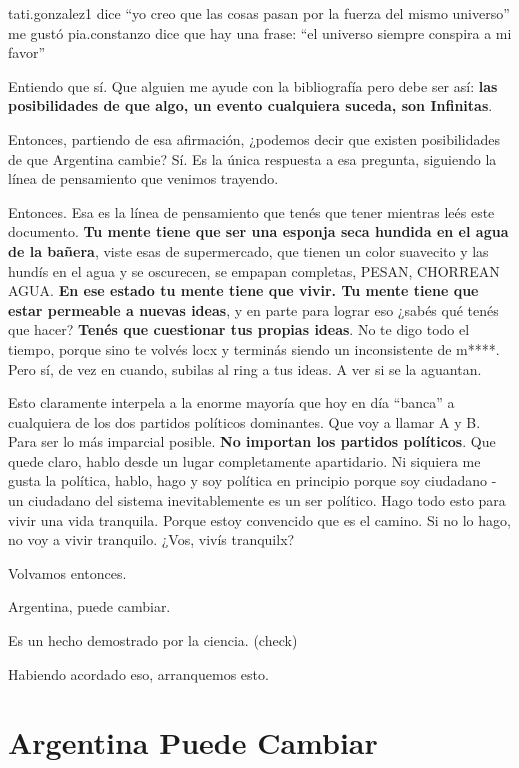 \documentclass[
]{book}
\begin{document}
tati.gonzalez1 dice ``yo creo que las cosas pasan por la fuerza del mismo universo'' me gustó
pia.constanzo dice que hay una frase: ``el universo siempre conspira a mi favor''

Entiendo que sí. Que alguien me ayude con la bibliografía pero debe ser así: \textbf{las posibilidades de que algo, un evento cualquiera suceda, son Infinitas}.

Entonces, partiendo de esa afirmación, ¿podemos decir que existen posibilidades de que Argentina cambie? Sí. Es la única respuesta a esa pregunta, siguiendo la línea de pensamiento que venimos trayendo.

Entonces. Esa es la línea de pensamiento que tenés que tener mientras leés este documento. \textbf{Tu mente tiene que ser una esponja seca hundida en el agua de la bañera}, viste esas de supermercado, que tienen un color suavecito y las hundís en el agua y se oscurecen, se empapan completas, PESAN, CHORREAN AGUA. \textbf{En ese estado tu mente tiene que vivir. Tu mente tiene que estar permeable a nuevas ideas}, y en parte para lograr eso ¿sabés qué tenés que hacer? \textbf{Tenés que cuestionar tus propias ideas}. No te digo todo el tiempo, porque sino te volvés locx y terminás siendo un inconsistente de m****. Pero sí, de vez en cuando, subilas al ring a tus ideas. A ver si se la aguantan.

Esto claramente interpela a la enorme mayoría que hoy en día ``banca'' a cualquiera de los dos partidos políticos dominantes. Que voy a llamar A y B. Para ser lo más imparcial posible. \textbf{No importan los partidos políticos}. Que quede claro, hablo desde un lugar completamente apartidario. Ni siquiera me gusta la política, hablo, hago y soy política en principio porque soy ciudadano - un ciudadano del sistema inevitablemente es un ser político. Hago todo esto para vivir una vida tranquila. Porque estoy convencido que es el camino. Si no lo hago, no voy a vivir tranquilo. ¿Vos, vivís tranquilx?

Volvamos entonces.

Argentina, puede cambiar.

Es un hecho demostrado por la ciencia. (check)

Habiendo acordado eso, arranquemos esto.

\hypertarget{argentina-puede-cambiar}{%
\section{Argentina Puede Cambiar}\label{argentina-puede-cambiar}}
\end{document}

